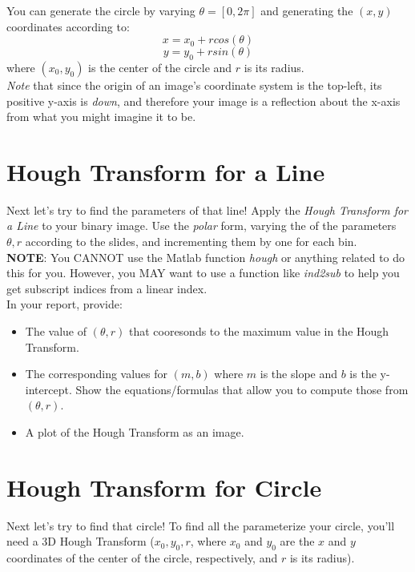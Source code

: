 \documentclass[12pt]{article}
\begin{document}
\noindent
You can generate the circle by varying $\theta =[0,2\pi]$ and generating the $(x,y)$ coordinates according to:
$$x =x_0 + rcos\left(\theta\right)$$
$$y=y_0 + rsin\left(\theta\right)$$
where $(x_0,y_0)$ is the center of the circle and $r$ is its radius.\\


\noindent
 \emph{Note} that since the origin of an image's coordinate system is the top-left, its positive y-axis is \emph{down}, and therefore your image is a reflection about the x-axis from what you might imagine it to be.

 
\newpage
\section{Hough Transform for a Line}
Next let's try to find the parameters of that line!  Apply the \emph{Hough Transform for a Line} to your binary image.  Use the \emph{polar} form, varying the of the parameters $\theta, r$ according to the slides, and incrementing them by one for each bin.\\

\noindent
\textbf{NOTE}:  You CANNOT use the Matlab function \emph{hough} or anything related to do this for you.  However, you MAY want to use a function like \emph{ind2sub} to help you get subscript indices from a linear index.\\

\noindent
In your report, provide:
\begin{itemize}
\item The value of $(\theta, r)$ that cooresonds to the maximum value in the Hough Transform.
\item The corresponding values for $(m,b)$ where $m$ is the slope and $b$ is the y-intercept.  Show the equations/formulas that allow you to compute those from $(\theta,r)$.
\item A plot of the Hough Transform as an image.
\end{itemize}


\newpage
\section{Hough Transform for Circle}
Next let's try to find that circle!  To find all the parameterize your circle, you'll need a 3D Hough Transform ($x_0, y_0, r$, where $x_0$ and $y_0$ are the $x$ and $y$ coordinates of the center of the circle, respectively, and $r$ is its radius).\\
\end{document}
